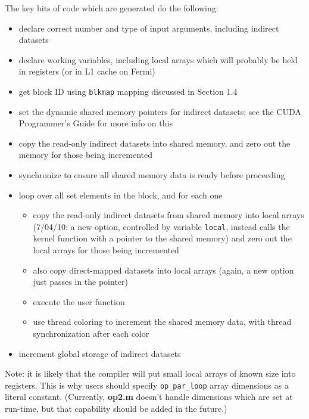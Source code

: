 \documentclass[12pt]{article}
\begin{document}
The key bits of code which are generated do the following:
\begin{itemize}
\item
declare correct number and type of input arguments, including
indirect datasets

\item
declare working variables, including local arrays which will probably
be held in registers (or in L1 cache on Fermi)

\item
get block ID using {\tt blkmap} mapping discussed in Section 1.4

\item
set the dynamic shared memory pointers for indirect datasets; see 
the CUDA Programmer's Guide for more info on this

\item
copy the read-only indirect datasets into shared memory, 
and zero out the memory for those being incremented

\item
synchronize to ensure all shared memory data is ready before proceeding

\item
loop over all set elements in the block, and for each one
 \begin{itemize}
 \item copy the read-only indirect datasets from shared memory 
       into local arrays 
       (7/04/10: a new option, controlled by variable {\tt local},
        instead calls the kernel function with a pointer to the 
        shared memory)
       and zero out the local arrays for those being incremented
 \item also copy direct-mapped datasets into local arrays (again,
       a new option just passes in the pointer)
 \item execute the user function
 \item use thread coloring to increment the shared memory data,
       with thread synchronization after each color
 \end{itemize}

\item
increment global storage of indirect datasets 

\end{itemize}

Note: it is likely that the compiler will put small local arrays of 
known size into registers.  This is why users should specify
{\tt op\_par\_loop} array dimensions as a literal constant.
(Currently, {\bf op2.m} doesn't handle dimensions which are set at 
run-time, but that capability should be added in the future.)
\end{document}
